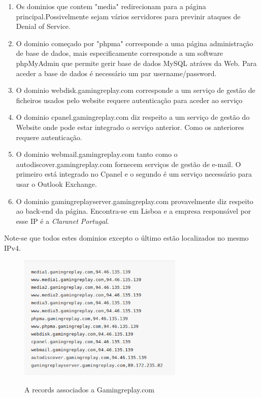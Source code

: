 \begin{enumerate}

\item Os dominios que contem "media" redirecionam para a página principal.Possivelmente sejam vários servidores para previnir ataques de Denial of Service.
\newline
\item O dominio começado por "phpma" corresponde a uma página administração de base de dados, mais especificamente corresponde a um software phpMyAdmin que permite gerir base de dados MySQL atráves da Web. Para aceder a base de dados é necessário um par username/password.
\newline
\item O dominio webdisk.gamingreplay.com corresponde a um serviço de gestão de ficheiros usados pelo website requere autenticação para aceder ao serviço
\newline
\item O dominio cpanel.gamingreplay.com diz respeito a um serviço de gestão do Website onde pode estar integrado o serviço anterior. Como os anteriores requere autenticação.
\newline
\item O dominio webmail.gamingreplay.com tanto como o autodiscover.gamingreplay.com fornecem serviços de gestão de e-mail. O primeiro está integrado no Cpanel e o segundo é um serviço necessário para usar o Outlook Exchange.
\newline
\item O dominio gamingreplayserver.gamingreplay.com provavelmente diz respeito ao back-end da página. Encontra-se em Lisboa e a empresa responsável por esse IP é a \emph{Claranet Portugal}.
\hfill\\
\end{enumerate}

Note-se que todos estes dominios excepto o último estão localizados no mesmo IPv4.

\begin{figure}[h!]
\caption{A records associados a Gamingreplay.com}
\centering
\includegraphics[width=\textwidth,height=6cm,keepaspectratio]{Images/DNSArecords.png}
\label{fig:DNSArecords}
\end{figure}

